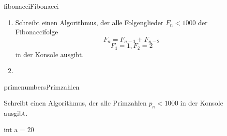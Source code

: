 \documentclass[parskip=half, final]{scrreprt}
\begin{document}
\begin{exc}

\begin{excitem}{fibonacci}{Fibonacci}

\begin{enumerate}
\item Schreibt einen Algorithmus, der alle Folgenglieder $F_n < 1000$ der Fibonaccifolge
\begin{equation}
F_n = F_{n-1} + F_{n-2}
\end{equation}
\begin{equation}
F_1=1, F_2=2
\end{equation}
in der Konsole ausgibt.
\item {}
\end{enumerate}

\end{excitem}

\begin{excitem}{primenumbers}{Primzahlen}

Schreibt einen Algorithmus, der alle Primzahlen $p_n<1000$ in der Konsole ausgibt. 


\begin{objclst}
int a = 20%
\end{objclst}

\end{excitem}

\end{exc}
\end{document}
